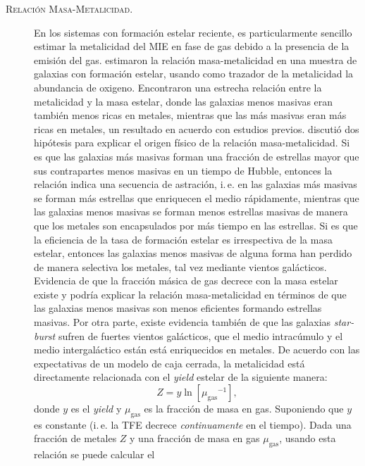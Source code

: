 \documentclass{article}
\begin{document}
\begin{description}
\item[\textsc{Relación Masa-Metalicidad.}] En los sistemas con formación estelar reciente, es
particularmente sencillo estimar la metalicidad del MIE en fase de gas debido a la presencia de la
emisión del gas. \citet{Tremonti2004} estimaron la relación masa-metalicidad en una muestra de
galaxias con formación estelar, usando como trazador de la metalicidad la abundancia de oxigeno.
Encontraron una estrecha relación entre la metalicidad y la masa estelar, donde las galaxias menos
masivas eran también menos ricas en metales, mientras que las más masivas eran más ricas en metales,
un resultado en acuerdo con estudios previos.
\citeauthor{Tremonti2004} discutió dos hipótesis para explicar el origen físico de la relación
masa-metalicidad. Si es que las galaxias más masivas forman una fracción de estrellas mayor que sus
contrapartes menos masivas en un tiempo de Hubble, entonces la relación indica una secuencia de
astración, i.\,e. en las galaxias más masivas se forman más estrellas que enriquecen el medio
rápidamente, mientras que las galaxias menos masivas se forman menos estrellas masivas de manera que
los metales son encapsulados por más tiempo en las estrellas.
Si es que la eficiencia de la tasa de formación estelar es irrespectiva de la masa estelar, entonces
las galaxias menos masivas de alguna forma han perdido de manera selectiva los metales, tal vez
mediante vientos galácticos.
Evidencia de que la fracción másica de gas decrece con la masa estelar existe \citep{Bell2000} y
podría explicar la relación masa-metalicidad en términos de que las galaxias menos masivas son menos
eficientes formando estrellas masivas. Por otra parte, existe evidencia también de que las galaxias
\emph{star-burst} sufren de fuertes vientos galácticos, que el medio intracúmulo y el medio
intergaláctico están está enriquecidos en metales.
%
De acuerdo con las expectativas de un modelo de caja cerrada, la metalicidad está directamente
relacionada con el \emph{yield} estelar de la siguiente manera:
%
$$
Z = y\ln{\left[{\mu_\text{gas}}^{-1}\right]},
$$
%
donde $y$ es el \emph{yield} y $\mu_\text{gas}$ es la fracción de masa en gas. Suponiendo que $y$ es
constante (i.\,e. la TFE decrece \emph{continuamente} en el tiempo). Dada una fracción de metales
$Z$ y una fracción de masa en gas $\mu_\text{gas}$, usando esta relación se puede calcular el

\end{description}
\end{document}
